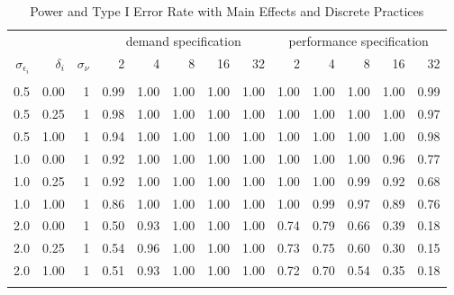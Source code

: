 \begin{table}

\caption{\label{tab:robustness-main-table}Power and Type I Error Rate with Main Effects and Discrete Practices}
\centering
\fontsize{8}{10}\selectfont
\begin{threeparttable}
\begin{tabular}[t]{rrrrrrrrrrrrr}
\toprule
\multicolumn{3}{c}{ } & \multicolumn{5}{c}{demand specification} & \multicolumn{5}{c}{performance specification} \\
\cmidrule(l{3pt}r{3pt}){4-8} \cmidrule(l{3pt}r{3pt}){9-13}
$\sigma_{\epsilon_i}$ & $\delta_i$ & $\sigma_{\nu}$ & 2 & 4 & 8 & 16 & 32 & 2 & 4 & 8 & 16 & 32\\
\midrule
\addlinespace[0.3em]
\multicolumn{13}{c}{\textbf{1 Discrete Practice - Power}}\\
\hspace{1em}0.5 & 0.00 & 1 & 0.99 & 1.00 & 1.00 & 1.00 & 1.00 & 1.00 & 1.00 & 1.00 & 1.00 & 0.99\\
\hspace{1em}0.5 & 0.25 & 1 & 0.98 & 1.00 & 1.00 & 1.00 & 1.00 & 1.00 & 1.00 & 1.00 & 1.00 & 0.97\\
\hspace{1em}0.5 & 1.00 & 1 & 0.94 & 1.00 & 1.00 & 1.00 & 1.00 & 1.00 & 1.00 & 1.00 & 1.00 & 0.98\\
\hspace{1em}1.0 & 0.00 & 1 & 0.92 & 1.00 & 1.00 & 1.00 & 1.00 & 1.00 & 1.00 & 1.00 & 0.96 & 0.77\\
\hspace{1em}1.0 & 0.25 & 1 & 0.92 & 1.00 & 1.00 & 1.00 & 1.00 & 1.00 & 1.00 & 0.99 & 0.92 & 0.68\\
\hspace{1em}1.0 & 1.00 & 1 & 0.86 & 1.00 & 1.00 & 1.00 & 1.00 & 1.00 & 0.99 & 0.97 & 0.89 & 0.76\\
\hspace{1em}2.0 & 0.00 & 1 & 0.50 & 0.93 & 1.00 & 1.00 & 1.00 & 0.74 & 0.79 & 0.66 & 0.39 & 0.18\\
\hspace{1em}2.0 & 0.25 & 1 & 0.54 & 0.96 & 1.00 & 1.00 & 1.00 & 0.73 & 0.75 & 0.60 & 0.30 & 0.15\\
\hspace{1em}2.0 & 1.00 & 1 & 0.51 & 0.93 & 1.00 & 1.00 & 1.00 & 0.72 & 0.70 & 0.54 & 0.35 & 0.18\\
\addlinespace[0.3em]
\multicolumn{13}{c}{\textbf{1 Discrete Practice - Type I}}\\

\end{tabular}
\end{threeparttable}
\end{table}
